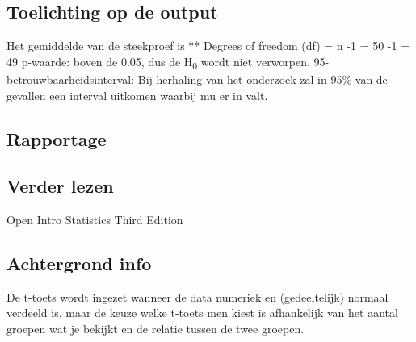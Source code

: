 \documentclass[]{article}
\begin{document}
\hypertarget{toelichting-op-de-output}{%
\subsection{Toelichting op de output}\label{toelichting-op-de-output}}

Het gemiddelde van de steekproef is ** Degrees of freedom (df) = n -1 =
50 -1 = 49 p-waarde: boven de 0.05, dus de H\textsubscript{0} wordt niet
verworpen. 95-betrouwbaarheidsinterval: Bij herhaling van het onderzoek
zal in 95\% van de gevallen een interval uitkomen waarbij mu er in valt.

\hypertarget{rapportage}{%
\subsection{Rapportage}\label{rapportage}}

\hypertarget{verder-lezen}{%
\subsection{Verder lezen}\label{verder-lezen}}

Open Intro Statistics Third Edition

\hypertarget{achtergrond-info}{%
\subsection{Achtergrond info}\label{achtergrond-info}}

De t-toets wordt ingezet wanneer de data numeriek en (gedeeltelijk)
normaal verdeeld is, maar de keuze welke t-toets men kiest is
afhankelijk van het aantal groepen wat je bekijkt en de relatie tussen
de twee groepen.
\end{document}
